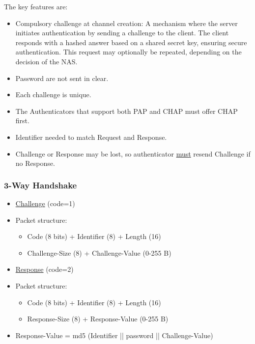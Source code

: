 The key features are: 
\begin{itemize}
    \item Compulsory challenge at channel creation: A mechanism where the server initiates authentication by sending a challenge to the client. The client responds with a hashed answer based on a shared secret key, ensuring secure authentication. This request may optionally be repeated, depending on the decision of the NAS.
    \item Password are not sent in clear.
    \item Each challenge is unique.
    \item The Authenticators that support both PAP and CHAP must offer CHAP first.
    \item Identifier needed to match Request and Response.
    \item Challenge or Response may be lost, so authenticator \underline{must} resend Challenge if no Response.
\end{itemize}

\subsubsection{3-Way Handshake}


\begin{tcolorbox}[colback=yellow!10!white, colframe=yellow!70!black, title=Authenticator \textrightarrow Peer] 
    
    \begin{itemize}
        \item \underline{Challenge} (code=1)
        \item Packet structure:
        \begin{itemize}
            \item Code (8 bits) + Identifier (8) + Length (16)
            \item Challenge-Size (8) + Challenge-Value (0-255 B)
        \end{itemize}
    \end{itemize}
\end{tcolorbox}


\begin{tcolorbox}[colback=yellow!10!white, colframe=yellow!70!black, title=Peer \textrightarrow Authenticator] 
    
    \begin{itemize}
        \item \underline{Response} (code=2)
        \item Packet structure:
        \begin{itemize}
            \item Code (8 bits) + Identifier (8) + Length (16)
            \item Response-Size (8) + Response-Value (0-255 B)
        \end{itemize}
        \item Response-Value = md5 (Identifier || password || Challenge-Value)
    \end{itemize}
\end{tcolorbox}




